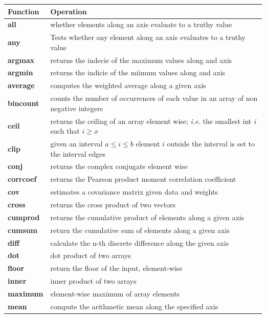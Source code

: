 \documentclass{article}
\theoremstyle{definition}
\theoremstyle{remark}
\begin{document}
\begin{table}[h!]
    \centering
    \begin{tabular}{p{2cm} p{10cm}}
    \hline
    Function & Operation \\
    \hline
    \textbf{all} & whether elements along an axis evaluate to a truthy value \\
    \textbf{any} & Tests whether any element along an axis evaluates to a truthy value \\
    \textbf{argmax} & returns the indecie of the maximum values along and axis \\
    \textbf{argmin} & returns the indicie of the miimum values along and axis \\
    \textbf{average} & computes the weighted average along a given axis \\
    \textbf{bincount} & counts the number of occurrences of each value in an array of non negative integers \\
    \textbf{ceil} & returns the ceiling of an array element wise; \textit{i.e.} the smallest int \textit{i} such that $ i \ge x$ \\
    \textbf{clip} & given an interval $ a \le i \le b $ element $ i $ outside the interval is set to the interval edges \\
    \textbf{conj} & returns the complex conjugate element wise \\
    \textbf{corrcoef} & returns the Pearson product moment correlation coefficient \\
    \textbf{cov} & estimates a covariance matrix given data and weights \\
    \textbf{cross} & returns the cross product of two vectors \\
    \textbf{cumprod} & returns the cumulative product of elements along a given axis \\
    \textbf{cumsum} & return the cumulative sum of elements along a given axis \\
    \textbf{diff} & calculate the n-th discrete difference along the given axis \\
    \textbf{dot} & dot product of two arrays \\
    \textbf{floor} & return the floor of the input, element-wise \\
    \textbf{inner} & inner product of two arrays \\
    \textbf{maximum} & element-wise maximum of array elements \\
    \textbf{mean} & compute the arithmetic mean along the specified axis \\

\end{tabular}
\end{table}
\end{document}
